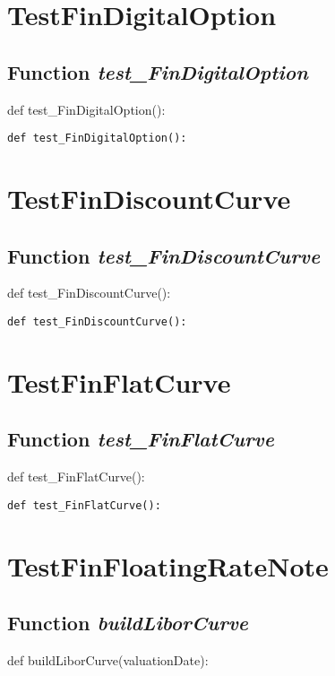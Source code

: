 \documentclass[twoside,11pt]{book}
\begin{document}
\newpage
\section{TestFinDigitalOption}

\subsection{Function {\it test\_FinDigitalOption}}
def test\_FinDigitalOption():

\begin{lstlisting}
def test_FinDigitalOption():
\end{lstlisting}


\newpage
\section{TestFinDiscountCurve}

\subsection{Function {\it test\_FinDiscountCurve}}
def test\_FinDiscountCurve():

\begin{lstlisting}
def test_FinDiscountCurve():
\end{lstlisting}


\newpage
\section{TestFinFlatCurve}

\subsection{Function {\it test\_FinFlatCurve}}
def test\_FinFlatCurve():

\begin{lstlisting}
def test_FinFlatCurve():
\end{lstlisting}


\newpage
\section{TestFinFloatingRateNote}

\subsection{Function {\it buildLiborCurve}}
def buildLiborCurve(valuationDate):
\end{document}
